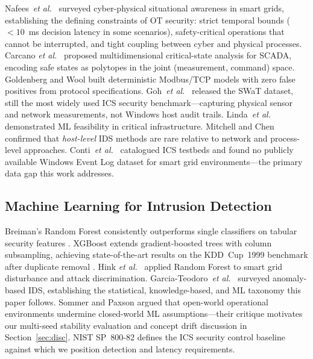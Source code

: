 Nafees~\textit{et al.}\ \cite{nafees2023} surveyed cyber-physical situational awareness
in smart grids, establishing the defining constraints of OT security: strict temporal
bounds ($<10$~ms decision latency in some scenarios), safety-critical operations that
cannot be interrupted, and tight coupling between cyber and physical processes. Carcano
\textit{et al.}\ \cite{carcano2011scada} proposed multidimensional critical-state
analysis for SCADA, encoding safe states as polytopes in the joint (measurement, command)
space. Goldenberg and Wool \cite{goldenberg2013modbus} built deterministic Modbus/TCP
models with zero false positives from protocol specifications. Goh~\textit{et al.}\
\cite{goh2016swat} released the SWaT dataset, still the most widely used ICS security
benchmark—capturing physical sensor and network measurements, not Windows host audit
trails. Linda~\textit{et al.}\ \cite{linda2009neural} demonstrated ML feasibility in
critical infrastructure. Mitchell and Chen \cite{mitchell2014survey} confirmed that
\emph{host-level} IDS methods are rare relative to network and process-level approaches.
Conti~\textit{et al.}\ \cite{conti2021survey} catalogued ICS testbeds and found no
publicly available Windows Event Log dataset for smart grid environments—the primary
data gap this work addresses.

\subsection{Machine Learning for Intrusion Detection}

Breiman's Random Forest \cite{breiman2001} consistently outperforms single classifiers on
tabular security features \cite{liao2013ids}. XGBoost \cite{chen2016xgboost} extends
gradient-boosted trees with column subsampling, achieving state-of-the-art results on
the KDD~Cup~1999 benchmark after duplicate removal \cite{tavallaee2009kdd}. Hink
\textit{et al.}\ \cite{hink2014machine} applied Random Forest to smart grid disturbance
and attack discrimination. Garcia-Teodoro~\textit{et al.}\ \cite{garcia2009anomaly}
surveyed anomaly-based IDS, establishing the statistical, knowledge-based, and ML
taxonomy this paper follows. Sommer and Paxson \cite{sommer2010outside} argued that
open-world operational environments undermine closed-world ML assumptions—their critique
motivates our multi-seed stability evaluation and concept drift discussion in
Section~\ref{sec:disc}. NIST SP~800-82 \cite{stouffer2015nist} defines the ICS security
control baseline against which we position detection and latency requirements.

